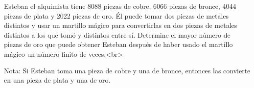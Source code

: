Esteban el alquimista tiene 8088 piezas de cobre, 6066 piezas de bronce, 4044 piezas de plata y 2022 piezas de oro. Él puede tomar dos piezas de metales distintos y usar un martillo mágico para convertirlas en dos piezas de metales distintos a los que tomó y distintos entre sí. Determine el mayor número de piezas de oro que puede obtener Esteban después de haber usado el martillo mágico un número finito de veces.<br>

Nota: Si Esteban toma una pieza de cobre y una de bronce, entonces las convierte en una pieza de plata y una de oro.